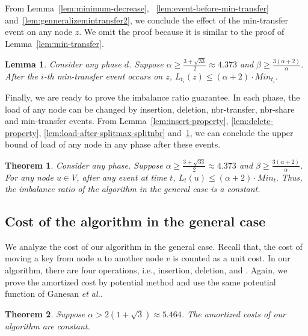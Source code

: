 \documentclass[a4paper]{article}
\newtheorem{theorem}{Theorem}
\newtheorem{lemma}{Lemma}
\begin{document}
From Lemma~\ref{lem:minimum-decrease},
~\ref{lem:event-before-min-transfer}
and~\ref{lem:genneralizemintransfer2}, we conclude the effect of the
min-transfer event on any node $z$. We omit the proof because it is
similar to the proof of Lemma~\ref{lem:min-transfer}.

\begin{lemma}
  \label{lem:min-transfer-general}
  Consider any phase $d$.  Suppose $\alpha \geq
  \frac{3+\sqrt{33}}{2}\approx 4.373$ and $\beta\geq
  \frac{3(\alpha+2)}{\alpha}$. After the $i$-th min-transfer event occurs on
  $z$, $ L_{t_i}(z)\leq(\alpha + 2)\cdot Min_{t_i}.  $
\end{lemma}

Finally, we are ready to prove the imbalance ratio guarantee. In each
phase, the load of any node can be changed by insertion, deletion,
nbr-transfer, nbr-share and min-transfer events.  From
Lemma~\ref{lem:insert-property}, \ref{lem:delete-property},
\ref{lem:load-after-splitmax-splitnbr}
and~\ref{lem:min-transfer-general},  we can conclude the upper bound of
load of any node in any phase after these events.

\begin{theorem}\label{thm:maxload2}
  Consider any phase. Suppose $\alpha \geq
  \frac{3+\sqrt{33}}{2}\approx 4.373$ and $\beta\geq
  \frac{3(\alpha+2)}{\alpha}$. For any node $u \in V$, after any event at time
  $t$, $ L_t(u)\leq(\alpha+2)\cdot Min_t. $ Thus, the imbalance ratio
  of the algorithm in the general case is a constant.
\end{theorem}	

\subsection{Cost of the algorithm in the general case}
\label{sect:imbalanceratioproof2}

We analyze the cost of our algorithm in the general case. Recall that, the
cost of moving a key from node $u$ to another node $v$ is counted as a unit
cost. In our algorithm, there are four operations, i.e., insertion,
deletion, {\minbalance} and {\split}. Again, we prove the amortized
cost by potential method and use the same potential function of
Ganesan {\em et al.}.

\begin{theorem}\label{thm:amortized_cost} 
 Suppose $\alpha>2(1+\sqrt{3})\approx 5.464$.  The amortized costs of our algorithm are constant.
\end{theorem}
\end{document}
